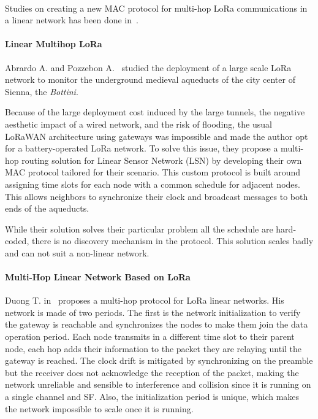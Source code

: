 \paragraph{}

Studies on creating a new MAC protocol for multi-hop LoRa communications in a linear
network has been done in~\cite{Abrardo_2019,duong2018}.

\paragraph{Linear Multihop LoRa}

Abrardo A. and Pozzebon A.~\cite{Abrardo_2019} studied the deployment of a
large scale LoRa network to monitor the underground medieval aqueducts of the city center
of Sienna, the \emph{Bottini}.

Because of the large deployment cost induced by the large tunnels, the negative
aesthetic impact of a wired network, and the risk of flooding,
the usual LoRaWAN architecture using gateways was impossible and made the author
opt for a battery-operated LoRa network.
To solve this issue, they propose a multi-hop routing solution for Linear Sensor
Network (LSN) by developing their own MAC protocol tailored for their scenario.
This custom protocol is built around assigning time slots for each node with
a common schedule for adjacent nodes.
This allows neighbors to synchronize their clock and broadcast messages to
both ends of the aqueducts.

While their solution solves their particular problem all the schedule are hard-coded,
there is no discovery mechanism in the protocol.
This solution scales badly and can not suit a non-linear network.


\paragraph{Multi-Hop Linear Network Based on LoRa}

Duong T. in~\cite{duong2018} proposes a multi-hop protocol for LoRa linear
networks.
His network is made of two periods. The first is the network initialization to
verify the gateway is reachable and synchronizes the nodes to make them join the
data operation period.
Each node transmits in a different time slot to their parent node, each hop adds
their information to the packet they are relaying until the gateway is
reached.
The clock drift is mitigated by synchronizing on the preamble but the receiver
does not acknowledge the reception of the packet, making the network unreliable
and sensible to interference and collision since it is running on a
single channel and SF.
Also, the initialization period is unique, which makes the network impossible to
scale once it is running.

